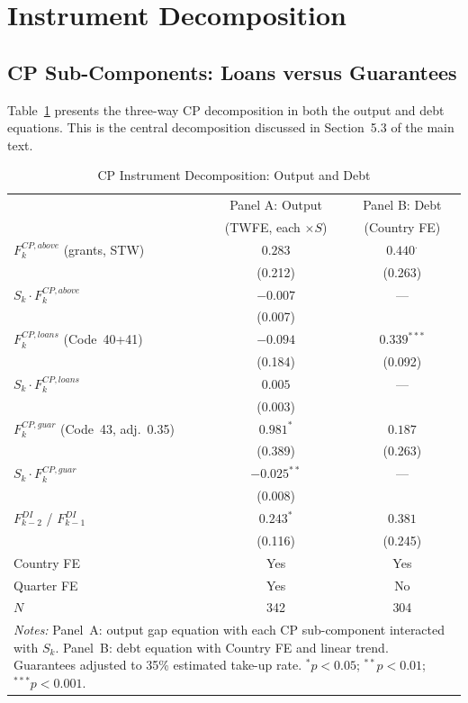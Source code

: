 \documentclass[12pt, a4paper]{article}
\begin{document}
\section{Instrument Decomposition}
\label{app:decomposition}

\subsection{CP Sub-Components: Loans versus Guarantees}

Table~\ref{tab:cp_decomp} presents the three-way CP decomposition in both the output and debt equations. This is the central decomposition discussed in Section~5.3 of the main text.

\begin{table}[htbp]
\centering
\caption{CP Instrument Decomposition: Output and Debt}
\label{tab:cp_decomp}
\small
\begin{tabular}{lcc}
\toprule
 & Panel A: Output & Panel B: Debt \\
 & (TWFE, each $\times S$) & (Country FE) \\
\midrule
$F_k^{CP,above}$ (grants, STW)
  & $0.283$ & $0.440^{.}$ \\
  & (0.212) & (0.263) \\[3pt]
$S_k \cdot F_k^{CP,above}$
  & $-0.007$ & --- \\
  & (0.007) & \\[3pt]
$F_k^{CP,loans}$ (Code~40+41)
  & $-0.094$ & $0.339^{***}$ \\
  & (0.184) & (0.092) \\[3pt]
$S_k \cdot F_k^{CP,loans}$
  & $0.005$ & --- \\
  & (0.003) & \\[3pt]
$F_k^{CP,guar}$ (Code~43, adj.~0.35)
  & $0.981^{*}$ & $0.187$ \\
  & (0.389) & (0.263) \\[3pt]
$S_k \cdot F_k^{CP,guar}$
  & $-0.025^{**}$ & --- \\
  & (0.008) & \\[3pt]
$F_{k-2}^{DI}$ / $F_{k-1}^{DI}$
  & $0.243^{*}$ & $0.381$ \\
  & (0.116) & (0.245) \\[3pt]
\midrule
Country FE & Yes & Yes \\
Quarter FE & Yes & No \\
$N$ & 342 & 304 \\
\bottomrule
\multicolumn{3}{p{11cm}}{\footnotesize \textit{Notes:} Panel~A: output gap equation with each CP sub-component interacted with $S_k$. Panel~B: debt equation with Country FE and linear trend. Guarantees adjusted to 35\% estimated take-up rate. $^{*}p<0.05$; $^{**}p<0.01$; $^{***}p<0.001$.} \\
\end{tabular}
\end{table}
\end{document}
